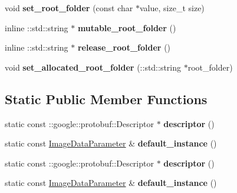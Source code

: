\begin{DoxyCompactItemize}
void {\bfseries set\+\_\+root\+\_\+folder} (const char $\ast$value, size\+\_\+t size)
\item 
\mbox{\label{classcaffe_1_1_image_data_parameter_a35ee68584dd4746ef0b27e619983a823}} 
inline \+::std\+::string $\ast$ {\bfseries mutable\+\_\+root\+\_\+folder} ()
\item 
\mbox{\label{classcaffe_1_1_image_data_parameter_a1e586c06366f71091a4fe5e97f3e8753}} 
inline \+::std\+::string $\ast$ {\bfseries release\+\_\+root\+\_\+folder} ()
\item 
\mbox{\label{classcaffe_1_1_image_data_parameter_a308ddfc3d1519068464057ef409b38c6}} 
void {\bfseries set\+\_\+allocated\+\_\+root\+\_\+folder} (\+::std\+::string $\ast$root\+\_\+folder)
\end{DoxyCompactItemize}
\subsection*{Static Public Member Functions}
\begin{DoxyCompactItemize}
\item 
\mbox{\label{classcaffe_1_1_image_data_parameter_aa3558fd4756d39060e1b7021155f7168}} 
static const \+::google\+::protobuf\+::\+Descriptor $\ast$ {\bfseries descriptor} ()
\item 
\mbox{\label{classcaffe_1_1_image_data_parameter_af9aeb8fa1060b51bca1459e2aa57eafe}} 
static const \mbox{\hyperlink{classcaffe_1_1_image_data_parameter}{Image\+Data\+Parameter}} \& {\bfseries default\+\_\+instance} ()
\item 
\mbox{\label{classcaffe_1_1_image_data_parameter_a73dffa81834fd2ef09f06e7522371a68}} 
static const \+::google\+::protobuf\+::\+Descriptor $\ast$ {\bfseries descriptor} ()
\item 
\mbox{\label{classcaffe_1_1_image_data_parameter_ac2c5f59b3ffde0c83a4a6c939efa141e}} 
static const \mbox{\hyperlink{classcaffe_1_1_image_data_parameter}{Image\+Data\+Parameter}} \& {\bfseries default\+\_\+instance} ()
\end{DoxyCompactItemize}
